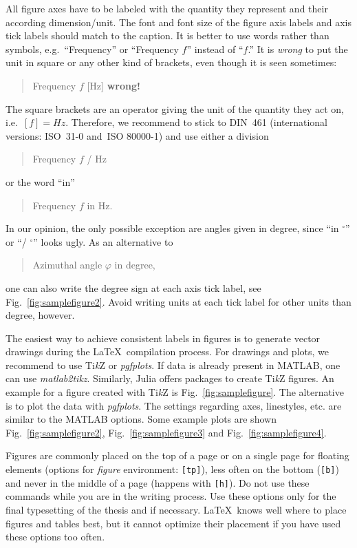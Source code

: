 All figure axes have to be labeled with the quantity they represent and their according dimension/unit. 
The font and font size of the figure axis labels and axis tick labels should match to the caption. 
It is better to use words rather than symbols, e.g.\ “Frequency” or “Frequency $f$” instead of “$f$.”
It is \emph{wrong} to put the unit in square or any other kind of brackets, even though it is seen sometimes:
\begin{quote}\small
    Frequency $f$ [Hz] \hspace {1cm}\textbf{wrong!}
\end{quote}
The square brackets are an operator giving the unit of the quantity they act on, i.e.\ $[f]=\si{Hz}$. 
Therefore, we recommend to stick to DIN~461 (international versions: ISO~31-0 and~ISO 80000-1) and use either a division
\begin{quote}\small
    Frequency $f$ / Hz
\end{quote}
or the word “in”
\begin{quote}\small
    Frequency $f$ in Hz.
\end{quote}
In our opinion, the only possible exception are angles given in degree, since “in $^\circ$” or “/ $^\circ$” looks ugly. 
As an alternative to
\begin{quote}\small
    Azimuthal angle $\varphi$ in degree,
\end{quote}
one can also write the degree sign at each axis tick label, see Fig.~\ref{fig:samplefigure2}. 
Avoid writing units at each tick label for other units than degree, however.

The easiest way to achieve consistent labels in figures is to generate vector drawings during the \LaTeX\ compilation process. 
For drawings and plots, we recommend to use Ti\emph{k}Z or \emph{pgfplots}. 
If data is already present in MATLAB, one can use \emph{matlab2tikz}. 
Similarly, Julia offers packages to create Ti\emph{k}Z figures. 
An example for a figure created with Ti\emph{k}Z is Fig.~\ref{fig:samplefigure}. 
The alternative is to plot the data with \emph{pgfplots}. 
The settings regarding axes, linestyles, etc. are similar to the MATLAB options. 
Some example plots are shown Fig.~\ref{fig:samplefigure2}, Fig.~\ref{fig:samplefigure3} and Fig.~\ref{fig:samplefigure4}. 

Figures are commonly placed on the top of a page or on a single page for floating elements (options for \emph{figure} environment: \verb|[tp]|), less often on the bottom (\verb|[b]|) and never in the middle of a page (happens with \verb|[h]|). 
Do not use these commands while you are in the writing process. 
Use these options only for the final typesetting of the thesis and if necessary. 
\LaTeX~knows well where to place figures and tables best, but it cannot optimize their placement if you have used these options too often.

